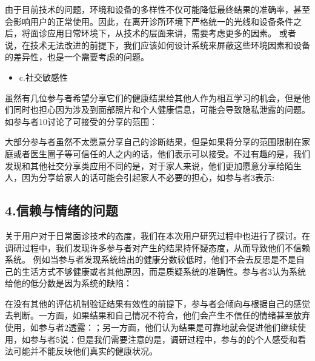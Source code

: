 由于目前技术的问题，环境和设备的多样性不仅可能降低最终结果的准确率，甚至会影响用户的正常使用。因此，在离开诊所环境下严格统一的光线和设备条件之后，将面诊应用日常环境下，从技术的层面来讲，需要考虑更多的因素。
或者说，在技术无法改进的前提下，我们应该如何设计系统来屏蔽这些环境因素和设备的差异性，也是一个需要考虑的问题。

\begin{itemize}
\item c.社交敏感性
\end{itemize}


虽然有几位参与者希望分享它们的健康结果给其他人作为相互学习的机会，但是他们同时也担心因为涉及到面部照片和个人健康信息，可能会导致隐私泄露的问题。
如参与者10讨论了可接受的分享的范围：

大部分参与者虽然不太愿意分享自己的诊断结果，但是如果将分享的范围限制在家庭或者医生圈子等可信任的人之内的话，他们表示可以接受。不过有趣的是，我们发现和其他社交分享类应用不同的是，对于家人来说，他们更加愿意分享给陌生人，因为分享给家人的话可能会引起家人不必要的担心，如参与者3表示: 


\subsection{4.信赖与情绪的问题}
关于用户对于日常面诊技术的态度，我们在本次用户研究过程中也进行了探讨。在调研过程中，我们发现许多参与者对产生的结果持怀疑态度，从而导致他们不信赖系统。
例如当参与者发现系统给出的健康分数较低时，他们不会去反思是不是自己的生活方式不够健康或者其他原因，而是质疑系统的准确性。参与者3认为系统给他的低分数是因为系统的缺陷：

在没有其他的评估机制验证结果有效性的前提下，参与者会倾向与根据自己的感觉去判断。一方面，如果结果和自己情况不符合，他们会产生不信任的情绪甚至放弃使用，如参与者2透露：；另一方面，他们认为结果是可靠地就会促进他们继续使用，如参与者5说：但是我们需要注意的是，调研过程中，参与的的个人感受和看法可能并不能反映他们真实的健康状况。

